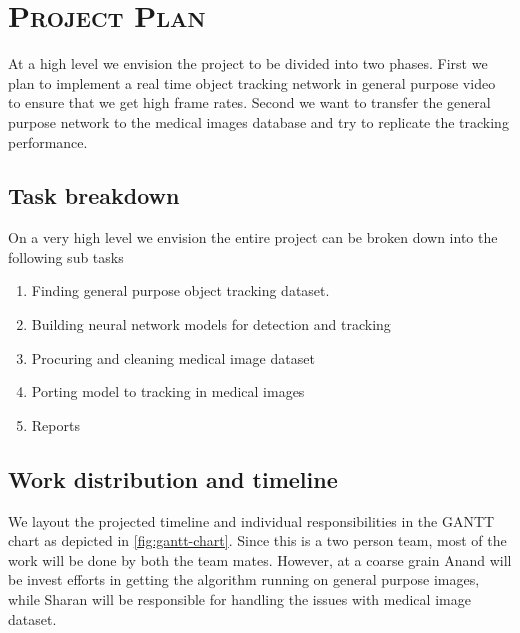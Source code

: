 \section{\textsc{Project Plan}}

At a high level we envision the project to be divided into two phases.
First we plan to implement a real time object tracking network in general purpose video to ensure that we get high frame rates. 
Second we want to transfer the general purpose network to the medical images database and try to replicate the tracking performance. 

\subsection{Task breakdown}

On a very high level we envision the entire project can be broken down into the following sub tasks

\begin{enumerate}
    \item {Finding general purpose object tracking dataset.}
    \item {Building neural network models for detection and tracking}
    \item {Procuring and cleaning medical image dataset}
    \item {Porting model to tracking in medical images}
    \item {Reports}
\end{enumerate}

\subsection{Work distribution and timeline}

We layout the projected timeline and individual responsibilities in the GANTT chart as depicted in \autoref{fig:gantt-chart}.
Since this is a two person team, most of the work will be done by both the team mates. However, at a coarse grain Anand will be invest efforts in getting the algorithm running on general purpose images, while Sharan will be responsible for handling the issues with medical image dataset. 